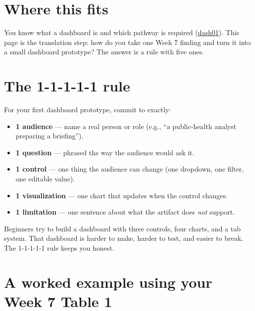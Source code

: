 \documentclass[
  letterpaper,
  DIV=11,
  numbers=noendperiod,
  oneside]{scrreprt}
\providecommand{\tightlist}{%
  \setlength{\itemsep}{0pt}\setlength{\parskip}{0pt}}
\begin{document}

\section*{Where this fits}\label{where-this-fits-12}


You know what a dashboard is and which pathway is required
(\hyperref[what-a-dashboard-is-and-three-pathways]{dash01}). This page
is the translation step: how do you take one Week 7 finding and turn it
into a small dashboard prototype? The answer is a rule with five ones.

\section*{The 1-1-1-1-1 rule}\label{the-1-1-1-1-1-rule}


For your first dashboard prototype, commit to exactly:

\begin{itemize}
\tightlist
\item
  \textbf{1 audience} --- name a real person or role (e.g., ``a
  public-health analyst preparing a briefing'').
\item
  \textbf{1 question} --- phrased the way the audience would ask it.
\item
  \textbf{1 control} --- one thing the audience can change (one
  dropdown, one filter, one editable value).
\item
  \textbf{1 visualization} --- one chart that updates when the control
  changes.
\item
  \textbf{1 limitation} --- one sentence about what the artifact does
  \emph{not} support.
\end{itemize}

Beginners try to build a dashboard with three controls, four charts, and
a tab system. That dashboard is harder to make, harder to test, and
easier to break. The 1-1-1-1-1 rule keeps you honest.

\section*{A worked example using your Week 7 Table
1}\label{a-worked-example-using-your-week-7-table-1}
\end{document}

